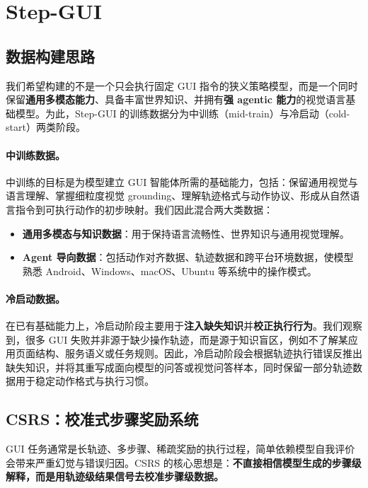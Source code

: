\section{Step-GUI}

\subsection{数据构建思路}

我们希望构建的不是一个只会执行固定 GUI 指令的狭义策略模型，而是一个同时保留\textbf{通用多模态能力}、具备丰富世界知识、并拥有\textbf{强 agentic 能力}的视觉语言基础模型。为此，Step-GUI 的训练数据分为中训练（mid-train）与冷启动（cold-start）两类阶段。

\paragraph{中训练数据。}
中训练的目标是为模型建立 GUI 智能体所需的基础能力，包括：保留通用视觉与语言理解、掌握细粒度视觉 grounding、理解轨迹格式与动作协议、形成从自然语言指令到可执行动作的初步映射。我们因此混合两大类数据：
\begin{itemize}
\item \textbf{通用多模态与知识数据}：用于保持语言流畅性、世界知识与通用视觉理解。
\item \textbf{Agent 导向数据}：包括动作对齐数据、轨迹数据和跨平台环境数据，使模型熟悉 Android、Windows、macOS、Ubuntu 等系统中的操作模式。
\end{itemize}

\paragraph{冷启动数据。}
在已有基础能力上，冷启动阶段主要用于\textbf{注入缺失知识}并\textbf{校正执行行为}。我们观察到，很多 GUI 失败并非源于缺少操作轨迹，而是源于知识盲区，例如不了解某应用页面结构、服务语义或任务规则。因此，冷启动阶段会根据轨迹执行错误反推出缺失知识，并将其重写成面向模型的问答或视觉问答样本，同时保留一部分轨迹数据用于稳定动作格式与执行习惯。

\subsection{CSRS：校准式步骤奖励系统}

GUI 任务通常是长轨迹、多步骤、稀疏奖励的执行过程，简单依赖模型自我评价会带来严重幻觉与错误归因。CSRS 的核心思想是：\textbf{不直接相信模型生成的步骤级解释，而是用轨迹级结果信号去校准步骤级数据。}

